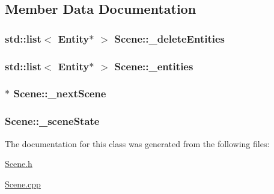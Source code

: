 \subsection{Member Data Documentation}
\hypertarget{class_scene_a886d916ab7695db8a4103b8a5fc2e098}{
\subsubsection[{\_\-deleteEntities}]{\setlength{\rightskip}{0pt plus 5cm}std::list$<$ {\bf Entity}$\ast$ $>$ {\bf Scene::\_\-deleteEntities}}}
\label{d6/db5/class_scene_a886d916ab7695db8a4103b8a5fc2e098}
\hypertarget{class_scene_a0819f6cd7c31259233dc36be35288118}{
\subsubsection[{\_\-entities}]{\setlength{\rightskip}{0pt plus 5cm}std::list$<$ {\bf Entity}$\ast$ $>$ {\bf Scene::\_\-entities}}}
\label{d6/db5/class_scene_a0819f6cd7c31259233dc36be35288118}
\hypertarget{class_scene_a93ba696da115a11e84d696be7f35c3d6}{
\subsubsection[{\_\-nextScene}]{$\ast$ {\bf Scene::\_\-nextScene}}}
\label{d6/db5/class_scene_a93ba696da115a11e84d696be7f35c3d6}
\hypertarget{class_scene_a2e429bb792232007aa02c7dd544cfc90}{
\subsubsection[{\_\-sceneState}]{ {\bf Scene::\_\-sceneState}}}
\label{d6/db5/class_scene_a2e429bb792232007aa02c7dd544cfc90}


The documentation for this class was generated from the following files:\begin{DoxyCompactItemize}
\item 
\hyperlink{_scene_8h}{Scene.h}\item 
\hyperlink{_scene_8cpp}{Scene.cpp}\end{DoxyCompactItemize}
